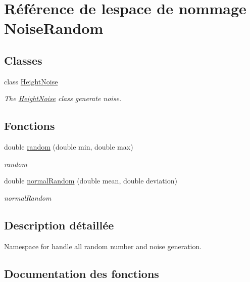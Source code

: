 \hypertarget{namespace_noise_random}{}\section{Référence de l\textquotesingle{}espace de nommage Noise\+Random}
\label{namespace_noise_random}
\subsection*{Classes}
\begin{DoxyCompactItemize}
\item 
class \hyperlink{class_noise_random_1_1_height_noise}{Height\+Noise}
\begin{DoxyCompactList}\small\item\em The \hyperlink{class_noise_random_1_1_height_noise}{Height\+Noise} class generate noise. \end{DoxyCompactList}\end{DoxyCompactItemize}
\subsection*{Fonctions}
\begin{DoxyCompactItemize}
\item 
double \hyperlink{namespace_noise_random_a9830d40f986d564ef30504f8dfb9ed90}{random} (double min, double max)
\begin{DoxyCompactList}\small\item\em random \end{DoxyCompactList}\item 
double \hyperlink{namespace_noise_random_a59564286391d50c76b1c9caf61e01233}{normal\+Random} (double mean, double deviation)
\begin{DoxyCompactList}\small\item\em normal\+Random \end{DoxyCompactList}\end{DoxyCompactItemize}


\subsection{Description détaillée}
Namespace for handle all random number and noise generation. 

\subsection{Documentation des fonctions}
\mbox{\label{namespace_noise_random_a59564286391d50c76b1c9caf61e01233}} 
